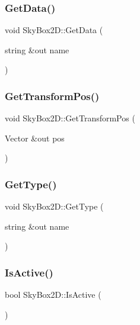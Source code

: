 \hypertarget{class_sky_box2_d_a1e1ce9ba7f691b71b8d1f91b86949b77}{}\label{class_sky_box2_d_a1e1ce9ba7f691b71b8d1f91b86949b77} 
\subsubsection{\texorpdfstring{Get\+Data()}{GetData()}}
{\footnotesize\ttfamily void Sky\+Box2\+D\+::\+Get\+Data (\begin{DoxyParamCaption}\item[{string \&out}]{name }\end{DoxyParamCaption})}

\hypertarget{class_sky_box2_d_a06c0595d530b08f15990614915b01782}{}\label{class_sky_box2_d_a06c0595d530b08f15990614915b01782} 
\subsubsection{\texorpdfstring{Get\+Transform\+Pos()}{GetTransformPos()}}
{\footnotesize\ttfamily void Sky\+Box2\+D\+::\+Get\+Transform\+Pos (\begin{DoxyParamCaption}\item[{Vector \&out}]{pos }\end{DoxyParamCaption})}

\hypertarget{class_sky_box2_d_a55fee69fdbeaf062f83a810c612a0896}{}\label{class_sky_box2_d_a55fee69fdbeaf062f83a810c612a0896} 
\subsubsection{\texorpdfstring{Get\+Type()}{GetType()}}
{\footnotesize\ttfamily void Sky\+Box2\+D\+::\+Get\+Type (\begin{DoxyParamCaption}\item[{string \&out}]{name }\end{DoxyParamCaption})}

\hypertarget{class_sky_box2_d_aadb71254cf3e64183d177c37bbfcab2c}{}\label{class_sky_box2_d_aadb71254cf3e64183d177c37bbfcab2c} 
\subsubsection{\texorpdfstring{Is\+Active()}{IsActive()}}
{\footnotesize\ttfamily bool Sky\+Box2\+D\+::\+Is\+Active (\begin{DoxyParamCaption}{ }\end{DoxyParamCaption})}

